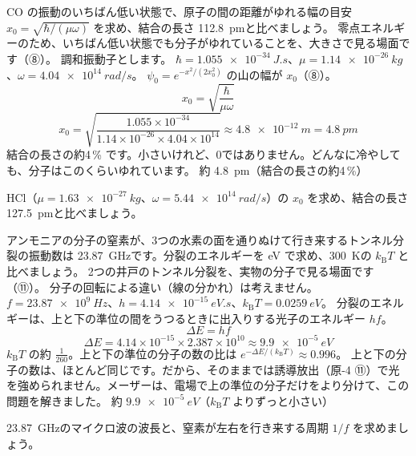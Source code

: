 \label{ph:原-6:ex10}
\begin{phreidai}[CO の零点のゆれの幅]
CO の振動のいちばん低い状態で、原子の間の距離がゆれる幅の目安 $x_0=\sqrt{\hbar/(\mu\omega)}$ を求め、結合の長さ \qty{112.8}{pm}と比べましょう。
\phbamen
零点エネルギーのため、いちばん低い状態でも分子がゆれていることを、大きさで見る場面です（⑧）。
\phmushi
調和振動子とします。
\phzu
$\hbar=\qty{1.055e-34}{J.s}$、$\mu=\qty{1.14e-26}{kg}$、$\omega=\qty{4.04e14}{rad/s}$。
\phriyu
$\psi_0=e^{-x^2/(2x_0^2)}$ の山の幅が $x_0$（⑧）。
\phtateru
\[x_0=\sqrt{\frac{\hbar}{\mu\omega}}\]
\phtoku
\[x_0=\sqrt{\frac{1.055\times10^{-34}}{1.14\times10^{-26}\times4.04\times10^{14}}}\approx\qty{4.8e-12}{m}=\qty{4.8}{pm}\]
\phtashikame
結合の長さの約4\,\% です。小さいけれど、0ではありません。どんなに冷やしても、分子はこのくらいゆれています。
\kotae 約 \qty{4.8}{pm}（結合の長さの約4\,\%）
\end{phreidai}
\begin{jibun}
HCl（$\mu=\qty{1.63e-27}{kg}$、$\omega=\qty{5.44e14}{rad/s}$）の $x_0$ を求め、結合の長さ \qty{127.5}{pm}と比べましょう。
\end{jibun}

\label{ph:原-6:ex11}
\begin{phreidai}[アンモニアのトンネル分裂]
アンモニアの分子の窒素が、3つの水素の面を通りぬけて行き来するトンネル分裂の振動数は \qty{23.87}{GHz}です。分裂のエネルギーを eV で求め、\qty{300}{K}の $k_{\mathrm B}T$ と比べましょう。
\phbamen
2つの井戸のトンネル分裂を、実物の分子で見る場面です（⑪）。
\phmushi
分子の回転による違い（線の分かれ）は考えません。
\phzu
$f=\qty{23.87e9}{Hz}$、$h=\qty{4.14e-15}{eV.s}$、$k_{\mathrm B}T=\qty{0.0259}{eV}$。
\phriyu
分裂のエネルギーは、上と下の準位の間をうつるときに出入りする光子のエネルギー $hf$。
\phtateru
\[\Delta E=hf\]
\phtoku
\[\Delta E=4.14\times10^{-15}\times2.387\times10^{10}\approx\qty{9.9e-5}{eV}\]
$k_{\mathrm B}T$ の約 $\tfrac{1}{260}$。上と下の準位の分子の数の比は $e^{-\Delta E/(k_{\mathrm B}T)}\approx0.996$。
\phtashikame
上と下の分子の数は、ほとんど同じです。だから、そのままでは誘導放出（原-4 ⑪）で光を強められません。メーザーは、電場で上の準位の分子だけをより分けて、この問題を解きました。
\kotae 約 $\qty{9.9e-5}{eV}$（$k_{\mathrm B}T$ よりずっと小さい）
\end{phreidai}
\begin{jibun}
\qty{23.87}{GHz}のマイクロ波の波長と、窒素が左右を行き来する周期 $1/f$ を求めましょう。
\end{jibun}

